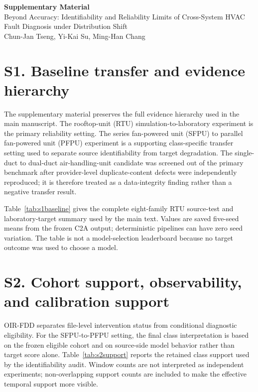 \documentclass[preprint,12pt]{elsarticle}
\begin{document}
\begin{center}
{\Large \textbf{Supplementary Material}}\\[0.5em]
{\large Beyond Accuracy: Identifiability and Reliability Limits of Cross-System HVAC Fault Diagnosis under Distribution Shift}\\[0.8em]
Chun-Jan Tseng, Yi-Kai Su, Ming-Han Chang
\end{center}

\section{S1. Baseline transfer and evidence hierarchy}
The supplementary material preserves the full evidence hierarchy used in the main manuscript. The rooftop-unit (RTU) simulation-to-laboratory experiment is the primary reliability setting. The series fan-powered unit (SFPU) to parallel fan-powered unit (PFPU) experiment is a supporting class-specific transfer setting used to separate source identifiability from target degradation. The single-duct to dual-duct air-handling-unit candidate was screened out of the primary benchmark after provider-level duplicate-content defects were independently reproduced; it is therefore treated as a data-integrity finding rather than a negative transfer result.

Table~\ref{tab:s1baseline} gives the complete eight-family RTU source-test and laboratory-target summary used by the main text. Values are saved five-seed means from the frozen C2A output; deterministic pipelines can have zero seed variation. The table is not a model-selection leaderboard because no target outcome was used to choose a model.

\begin{table}[H]
\centering
\caption{RTU simulation-to-laboratory baseline summary. BA denotes balanced accuracy and ECE expected calibration error.}
\label{tab:s1baseline}
\resizebox{\textwidth}{!}{}
\end{table}

\section{S2. Cohort support, observability, and calibration support}
OIR-FDD separates file-level intervention status from conditional diagnostic eligibility. For the SFPU-to-PFPU setting, the final class interpretation is based on the frozen eligible cohort and on source-side model behavior rather than target score alone. Table~\ref{tab:s2support} reports the retained class support used by the identifiability audit. Window counts are not interpreted as independent experiments; non-overlapping support counts are included to make the effective temporal support more visible.
\end{document}
